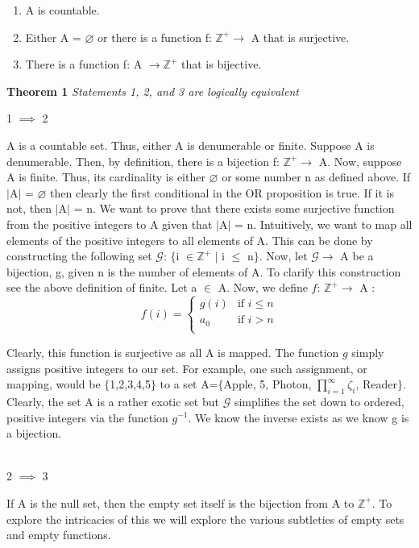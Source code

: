 \documentclass{article}
\begin{document}
\begin{enumerate}
\item A is countable.
\item Either A = $\varnothing$ or there is a function f: $\mathbb{Z}^{+} \to$ A that is surjective.
\item There is a function f: A $\to \mathbb{Z}^{+}$ that is bijective.
\end{enumerate}
\textbf{Theorem 1}
\textit{Statements 1, 2, and 3 are logically equivalent}
\begin{flushleft}
1 $\implies$ 2
\end{flushleft}
\par A is a countable set. Thus, either A is denumerable or finite. Suppose A is denumerable. Then, by definition, there is a bijection f: $\mathbb{Z}^{+} \to$ A. Now, suppose A is finite. Thus, its cardinality is either $\varnothing$ or some number n as defined above. If $|$A$|$ = $\varnothing$ then clearly the first conditional in the OR proposition is true. If it is not, then $|$A$|$ = n. We want to prove that there exists some surjective function from the positive integers to A given that $|$A$|$ = n. Intuitively, we want to map all elements of the positive integers to all elements of A. This can be done by constructing the following set $\mathcal{G}$: $\{$i $\in \mathbb{Z}^{+}$ $|$ i $\leq$ n$\}$. Now, let $\mathcal{G} \to$ A be a bijection, g, given n is the number of elements of A. To clarify this construction see the above definition of finite. Let a $\in$ A. Now, we define $f$: $\mathbb{Z}^{+} \to$ A :
\[ f(i) =
	\begin{cases} 
      g(i) & \text{if } i \leq n \\
      a_{0} & \text{if } i > n \\
   \end{cases}
\]
\par Clearly, this function is surjective as all A is mapped. The function $g$ simply assigns positive integers to our set. For example, one such assignment, or mapping, would be $\{$1,2,3,4,5$\}$ to a set A=$\{$Apple, 5, Photon, $\prod_{i=1}^{\infty} \zeta_{i}$, Reader$\}$. Clearly, the set A is a rather exotic set but $\mathcal{G}$ simplifies the set down to ordered, positive integers via the function $g^{-1}$. We know the inverse exists as we know g is a bijection.
\\
\\
\begin{flushleft}
2 $\implies$ 3
\end{flushleft}
\par If A is the null set, then the empty set itself is the bijection from A to $\mathbb{Z}^{+}$. To explore the intricacies of this we will explore the various subtleties of empty sets and empty functions.
\end{document}
